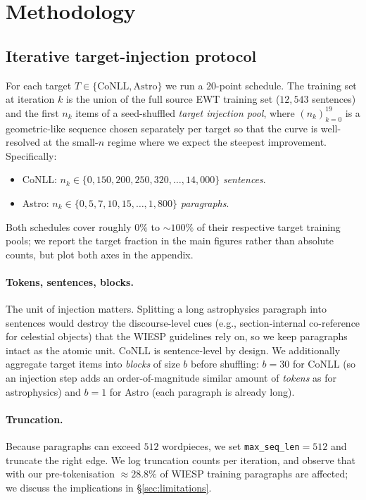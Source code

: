 \documentclass[11pt]{article}
\begin{document}
\section{Methodology}
\label{sec:method}

\subsection{Iterative target-injection protocol}
\label{sec:protocol}

For each target $T \in \{\text{CoNLL}, \text{Astro}\}$ we run a $20$-point
schedule. The training set at iteration $k$ is the union of the full source
EWT training set ($12{,}543$ sentences) and the first $n_k$ items of a
seed-shuffled \emph{target injection pool}, where $(n_k)_{k=0}^{19}$ is a
geometric-like sequence chosen separately per target so that the curve is
well-resolved at the small-$n$ regime where we expect the steepest
improvement. Specifically:
\begin{itemize}
  \item CoNLL: $n_k \in \{0, 150, 200, 250, 320, \ldots, 14{,}000\}$ \emph{sentences}.
  \item Astro: $n_k \in \{0, 5, 7, 10, 15, \ldots, 1{,}800\}$ \emph{paragraphs}.
\end{itemize}
Both schedules cover roughly $0\%$ to $\sim$$100\%$ of their respective target
training pools; we report the target fraction in the main figures rather
than absolute counts, but plot both axes in the appendix.

\paragraph{Tokens, sentences, blocks.}
The unit of injection matters. Splitting a long astrophysics paragraph into
sentences would destroy the discourse-level cues (e.g., section-internal
co-reference for celestial objects) that the WIESP guidelines rely on, so we
keep paragraphs intact as the atomic unit. CoNLL is sentence-level by design.
We additionally aggregate target items into \emph{blocks} of size $b$ before
shuffling: $b{=}30$ for CoNLL (so an injection step adds an order-of-magnitude
similar amount of \emph{tokens} as for astrophysics) and $b{=}1$ for Astro
(each paragraph is already long).

\paragraph{Truncation.}
Because paragraphs can exceed $512$ wordpieces, we set
\texttt{max\_seq\_len}$=512$ and truncate the right edge. We log truncation
counts per iteration, and observe that with our pre-tokenisation
$\approx$$28.8\%$ of WIESP training paragraphs are affected; we discuss the
implications in \S\ref{sec:limitations}.
\end{document}
